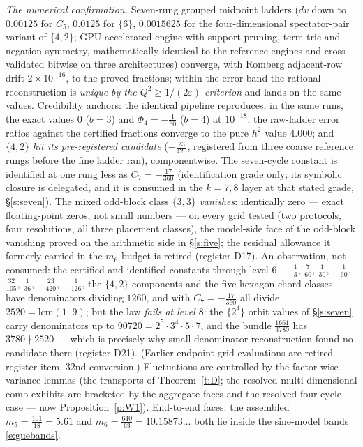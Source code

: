 \documentclass[11pt]{article}
\numberwithin{equation}{section}
\theoremstyle{definition}
\theoremstyle{remark}
\begin{document}
\emph{The numerical confirmation.} Seven-rung grouped
midpoint ladders ($dv$ down to $0.00125$ for $C_5$, $0.0125$
for $\{6\}$, $0.0015625$ for the four-dimensional
spectator-pair variant of $\{4,2\}$; GPU-accelerated engine
with support pruning, term trie and negation symmetry,
mathematically identical to the reference engines and
cross-validated bitwise on three architectures) converge, with
Romberg adjacent-row drift $2\times10^{-16}$, to the proved
fractions; within the error band the rational reconstruction
is \emph{unique by the $Q^{2}\ge1/(2\varepsilon)$ criterion}
and lands on the same values. Credibility anchors: the
identical pipeline reproduces, in the same runs, the exact
values $0$ ($b=3$) and $\Phi_4=-\tfrac1{60}$ ($b=4$) at
$10^{-18}$; the raw-ladder error ratios against the certified
fractions converge to the pure $h^{2}$ value $4.000$; and
$\{4,2\}$ \emph{hit its pre-registered candidate}
($-\tfrac{23}{420}$, registered from three coarse reference
rungs before the fine ladder ran), componentwise. The
seven-cycle constant is identified at one rung less as
$C_7=-\tfrac{17}{360}$ (identification grade only; its
symbolic closure is delegated, and it is consumed in the
$k=7,8$ layer at that stated grade, \S\ref{s:seven}). The mixed
odd-block class $\{3,3\}$ \emph{vanishes}: identically zero
--- exact floating-point zeros, not small numbers --- on every
grid tested (two protocols, four resolutions, all three
placement classes), the model-side face of the odd-block
vanishing proved on the arithmetic side in \S\ref{s:five};
the residual allowance it formerly carried in the $m_6$ budget
is retired (register D17). An
observation, not consumed: the certified and identified
constants through level $6$ --- $\tfrac13$, $\tfrac7{60}$,
$\tfrac1{30}$,
$-\tfrac1{60}$, $\tfrac{32}{105}$, $\tfrac1{36}$,
$-\tfrac{23}{420}$, $-\tfrac1{126}$, the $\{4,2\}$
components and the five hexagon chord classes --- have
denominators dividing $1260$, and with
$C_7=-\tfrac{17}{360}$ all divide $2520=\mathrm{lcm}(1..9)$;
but the law \emph{fails at level $8$}: the $\{2^4\}$ orbit
values of \S\ref{s:seven} carry denominators up to $90720
=2^5\cdot3^4\cdot5\cdot7$, and the bundle
$\tfrac{1661}{3780}$ has $3780\nmid2520$ --- which is
precisely why small-denominator reconstruction found no
candidate there (register D21).
(Earlier endpoint-grid evaluations are retired --- register
item, 32nd conversion.)
Fluctuations are
controlled by the factor-wise variance lemmas (the transports of
Theorem~\ref{t:D}; the resolved multi-dimensional comb exhibits
are bracketed by the aggregate faces and the resolved four-cycle
case --- now Proposition~\ref{p:W1}). End-to-end faces: the
assembled
$m_5=\tfrac{101}{18}=5.6\overline{1}$ and
$m_6=\tfrac{640}{63}=10.15873\ldots$ both lie inside the
sine-model bands \eqref{e:guebands}.
\end{document}
